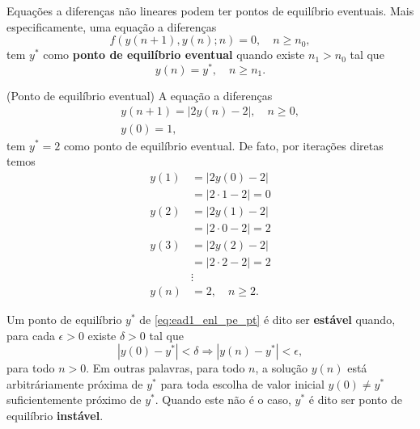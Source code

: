 Equações a diferenças não lineares podem ter pontos de equilíbrio eventuais. Mais especificamente, uma equação a diferenças
\begin{equation}\label{eq:ead1_enl_pe_pt}
  f(y(n+1),y(n);n)=0,\quad n\geq n_0,
\end{equation}
tem $y^*$ como {\bf ponto de equilíbrio eventual} quando existe $n_1>n_0$ tal que
\begin{equation}
  y(n) = y^*,\quad n\geq n_1.
\end{equation}

\begin{ex}(Ponto de equilíbrio eventual)
  A equação a diferenças
  \begin{align}
    y(n+1) = |2y(n)-2|,\quad n\geq 0,\\
    y(0) = 1,
  \end{align}
  tem $y^* = 2$ como ponto de equilíbrio eventual. De fato, por iterações diretas temos
  \begin{align}
    y(1) &= |2y(0)-2| \\
    &= |2\cdot 1 - 2| = 0 \\
    y(2) &= |2y(1)-2| \\
    &= |2\cdot 0 - 2| = 2 \\
    y(3) &= |2y(2) - 2| \\
    &= |2\cdot 2 - 2| = 2 \\
    &\vdots \\
    y(n) &= 2,\quad n\geq 2.
  \end{align}
\end{ex}

Um ponto de equilíbrio $y^*$ de \eqref{eq:ead1_enl_pe_pt} é dito ser {\bf estável} quando, para cada $\epsilon>0$ existe $\delta>0$ tal que
\begin{equation}
  |y(0)-y^*|<\delta \Rightarrow |y(n)-y^*|<\epsilon,
\end{equation}
para todo $n>0$. Em outras palavras, para todo $n$, a solução $y(n)$ está arbitráriamente próxima de $y^*$ para toda escolha de valor inicial $y(0)\neq y^*$ suficientemente próximo de $y^*$. Quando este não é o caso, $y^*$ é dito ser ponto de equilíbrio {\bf instável}.

